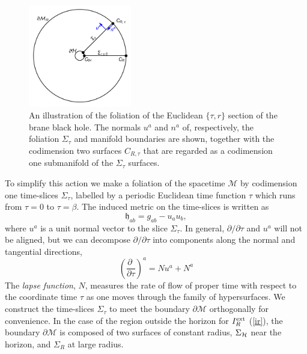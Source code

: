 \documentclass[aps,12pt,prd,superscriptaddress,preprintnumbers, 
	amssymb,
	amsmath,
	notitlepage,
	longbibliography,
	nofootinbib]{revtex4-1}
\begin{document}
\begin{figure}[htb]
\centering
\includegraphics[width=0.4\textwidth]{canon.pdf}
\caption{
An illustration of the foliation of the Euclidean $\{\tau,r\}$ section
of the brane black hole. The normals $u^a$ and $n^a$ of, respectively, 
the foliation $\Sigma_\tau$ and manifold boundaries are shown, together
with the codimension two surfaces $C_{R,\tau}$ that are regarded as
a codimension one submanifold of the $\Sigma_\tau$ surfaces.}
\label{fig:canon}
\end{figure}

To simplify this action we make a foliation of the spacetime 
$\mathcal{M}$ by codimension one time-slices 
$\Sigma_\tau$, labelled by a periodic Euclidean time function 
$\tau$ which runs from $\tau=0$ to $\tau=\beta$. 
The induced metric on the time-slices is written as
\begin{equation}
\mathfrak{h}_{ab}=g_{ab} - u_a u_b,
\end{equation}
where $u^a$ is a unit normal vector to the slice $\Sigma_\tau$.
In general,  $\partial/\partial\tau$ and $u^a$ will not be 
aligned, but we can decompose $\partial/\partial\tau$ into components 
along the normal and tangential directions, 
\begin{equation}
\left ( \frac{\partial \;}{\partial\tau} \right) ^a = N u^a + N^a
\label{TBHtau}
\end{equation}
The \textit{lapse function}, $N$, measures the rate of flow of 
proper time with respect to the coordinate 
time $\tau$ as one moves through the family of hypersurfaces.
We construct the time-slices $\Sigma_\tau$  to meet the boundary  
$\partial \mathcal{M}$ orthogonally
for convenience. In the case of the region outside the horizon  
for $I_R^{\rm ext}$ (\ref{ir}), the boundary $\partial \mathcal{M}$ is 
composed of two surfaces of constant radius, $\Sigma_{\cal H}$ near
the horizon, and $\Sigma_R$ at large radius.
\end{document}
